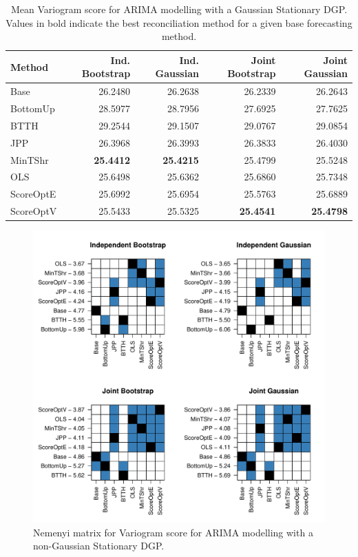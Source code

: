 \documentclass[12pt]{article}
\theoremstyle{definition}
\begin{document}
\begin{table}[H]
	
	\caption{\label{tab:nsv}Mean Variogram score for ARIMA 
		modelling with a Gaussian Stationary DGP.  Values in bold indicate the best reconciliation method for a given base forecasting method.}
	\centering
	\begin{tabular}[t]{l|r|r|r|r}
		\hline
		Method & Ind. Bootstrap & Ind. Gaussian & Joint Bootstrap & Joint Gaussian\\
		\hline
		Base & 26.2480 & 26.2638 & 26.2339 & 26.2643\\
		\hline
		BottomUp & 28.5977 & 28.7956 & 27.6925 & 27.7625\\
		\hline 
		BTTH & 29.2544 & 29.1507 & 29.0767 & 29.0854\\
		\hline
		JPP & 26.3968 & 26.3993 & 26.3833 & 26.4030\\
		\hline
		MinTShr & \textbf{25.4412} & \textbf{25.4215} & 25.4799 & 25.5248\\
		\hline
		OLS & 25.6498 & 25.6362 & 25.6860 & 25.7348\\
		\hline
		ScoreOptE & 25.6992 & 25.6954 & 25.5763 & 25.6889\\
		\hline
		ScoreOptV & 25.5433 & 25.5325 & \textbf{25.4541} & \textbf{25.4798}\\
		\hline
	\end{tabular}
\end{table}

\begin{figure}[H]
	\label{fig:nsv}
	\includegraphics[width=.95\textwidth]{Figs/nsv.pdf}
	\caption{Nemenyi matrix for Variogram score for ARIMA 
		modelling with a non-Gaussian Stationary DGP.}
\end{figure}	
\end{document}
